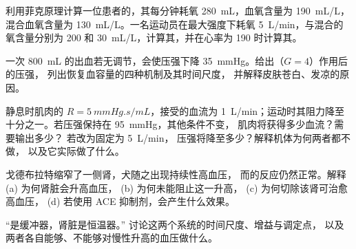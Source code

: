 \begin{exercise}[$\star\star$]\label{exo:b2:blood-pressure:8}
利用菲克原理计算一位患者的，其每分钟耗氧
\qty{280}{mL}，血氧含量为 \qty{190}{mL/L}，混合血氧含量为
\qty{130}{mL/L}。一名运动员在最大强度下耗氧
\qty{5}{L/min}，与混合的氧含量分别为 200 和
\qty{30}{mL/L}，计算其，并在心率为 190 时计算其。
\end{exercise}

\begin{exercise}[$\star\star$]\label{exo:b2:blood-pressure:9}
一次 \qty{800}{mL} 的出血若无调节，会使压强下降
\qty{35}{mmHg}。给出（$G = 4$）作用后的压强，
列出恢复血容量的四种机制及其时间尺度，
并解释皮肤苍白、发凉的原因。
\end{exercise}

\begin{exercise}[$\star\star\star$]\label{exo:b2:blood-pressure:10}
静息时肌肉的 $R = \qty{5}{mmHg.s/mL}$，接受的血流为
\qty{1}{L/min}；运动时其阻力降至十分之一。若压强保持在
\qty{95}{mmHg}，其他条件不变，
肌肉将获得多少血流？需要输出多少？
若改为固定为 \qty{5}{L/min}，
压强将降至多少？解释机体为何两者都不做，
以及它实际做了什么。
\end{exercise}

\begin{exercise}[$\star\star\star$]\label{exo:b2:blood-pressure:11}
戈德布拉特缩窄了一侧肾，犬随之出现持续性高血压，
而的反应仍然正常。解释 (a) 为何肾脏会升高血压，
(b) 为何未能阻止这一升高，
(c) 为何切除该肾可治愈高血压，
(d) 若使用 ACE 抑制剂，会产生什么效果。
\end{exercise}

\begin{exercise}[$\star\star\star$]\label{exo:b2:blood-pressure:12}
“是缓冲器，肾脏是恒温器。”
讨论这两个系统的时间尺度、增益与调定点，
以及两者各自能够、不能够对慢性升高的血压做什么。
\end{exercise}


